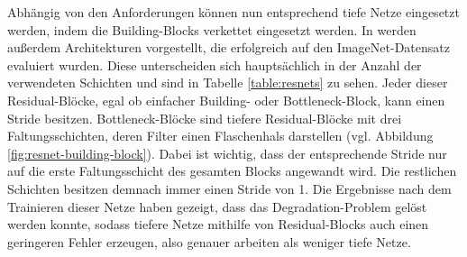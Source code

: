 Abhängig von den Anforderungen können nun entsprechend tiefe Netze eingesetzt
werden, indem die Building-Blocks verkettet eingesetzt werden. In
\cite{he2015deep} werden außerdem Architekturen vorgestellt, die
erfolgreich auf den ImageNet-Datensatz \cite{deng2009imagenet} evaluiert wurden.
Diese unterscheiden sich hauptsächlich in der Anzahl der verwendeten Schichten
und sind in Tabelle \ref{table:resnets} zu sehen. Jeder dieser Residual-Blöcke,
egal ob einfacher Building- oder Bottleneck-Block, kann einen Stride besitzen. Bottleneck-Blöcke sind tiefere Residual-Blöcke mit drei Faltungsschichten, deren Filter einen Flaschenhals darstellen (vgl. Abbildung \ref{fig:resnet-building-block}).
Dabei ist wichtig, dass der entsprechende Stride nur auf die erste
Faltungsschicht des gesamten Blocks angewandt wird. Die restlichen Schichten
besitzen demnach immer einen Stride von 1. Die Ergebnisse nach dem Trainieren
dieser Netze haben gezeigt, dass das Degradation-Problem gelöst werden konnte,
sodass tiefere Netze mithilfe von Residual-Blocks auch einen geringeren Fehler
erzeugen, also genauer arbeiten als weniger tiefe Netze.

